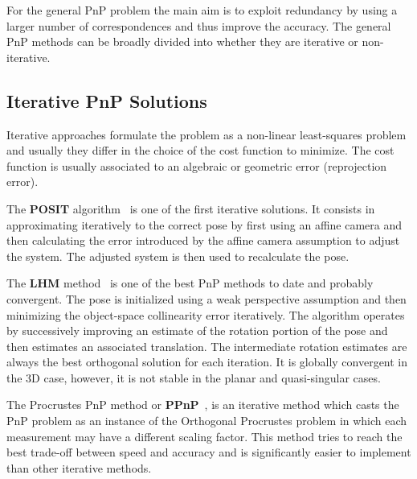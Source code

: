 \documentclass[letterpaper, 10 pt, conference]{ieeeconf}  %
\begin{document}
	For the general PnP problem the main aim is to exploit redundancy by using a larger number of correspondences and thus improve the accuracy. The general PnP methods can be broadly divided into whether they are iterative or non-iterative.
	
	\subsection{Iterative PnP Solutions}
	
	Iterative approaches formulate the problem as a non-linear least-squares problem and usually they differ in the choice of the cost function to minimize. The cost function is usually associated to an algebraic or geometric error (reprojection error). 
	
	The \textbf{POSIT} algorithm~\cite{Oberkampf1996} is one of the first iterative solutions. It consists in approximating iteratively to the correct pose by first using an affine camera and then calculating the error introduced by the affine camera assumption to adjust the system. The adjusted system is then used to recalculate the pose. %
	
	The \textbf{LHM} method~\cite{Lu2000} is one of the best PnP methods to date and probably convergent. The pose is initialized using a weak perspective assumption and then minimizing the object-space collinearity error iteratively. The algorithm operates by successively improving an estimate of the rotation portion of the pose and then estimates an associated translation. The intermediate rotation estimates are always the best orthogonal solution for each iteration. It is globally convergent in the 3D case, however, it is not stable in the planar and quasi-singular cases. %
	
	
	The Procrustes PnP method or \textbf{PPnP}~\cite{Garro2012}, is an iterative method which casts the PnP problem as an instance of the Orthogonal Procrustes problem in which each measurement may have a different scaling factor. This method tries to reach the best trade-off between speed and accuracy and is significantly easier to implement than other iterative methods.   %
	
\end{document}
